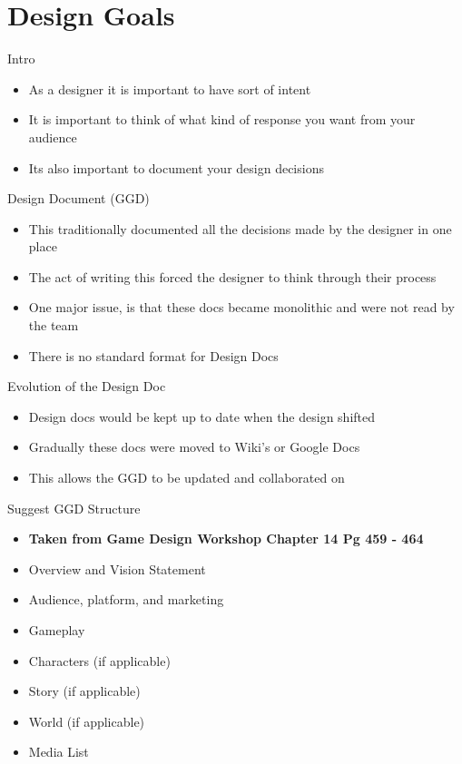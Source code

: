 \part{Design Goals}
\frame{\partpage}

\begin{frame}{Intro}
	\begin{itemize}
		\item As a designer it is important to have sort of intent
		\item It is important to think of what kind of response you want from your audience
		\item Its also important to document your design decisions
	\end{itemize}
\end{frame}

\begin{frame}{Design Document (GGD)}
	\begin{itemize}
		\item This traditionally documented all the decisions made by the designer in one place
		\item The act of writing this forced the designer to think through their process
		\item One major issue, is that these docs became monolithic and were not read by the team
		\item There is no standard format for Design Docs
	\end{itemize}
\end{frame}

\begin{frame}{Evolution of the Design Doc}
	\begin{itemize}
		\item Design docs would be kept up to date when the design shifted
		\item Gradually these docs were moved to Wiki's or Google Docs
		\item This allows the GGD to be updated and collaborated on
	\end{itemize}
\end{frame}

\begin{frame}{Suggest GGD Structure}
	\begin{itemize}
		\item \textbf{Taken from Game Design Workshop Chapter 14 Pg 459 - 464} 
		\item Overview and Vision Statement
		\item Audience, platform, and marketing
		\item Gameplay
		\item Characters (if applicable)
		\item Story (if applicable)
		\item World (if applicable)
		\item Media List
	\end{itemize}
\end{frame}

